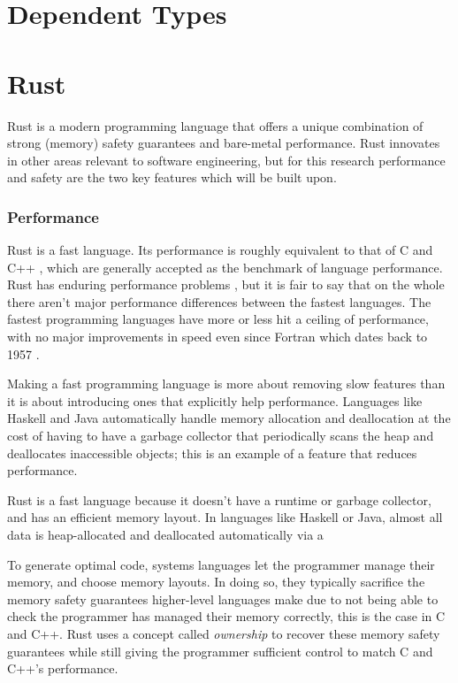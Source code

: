 \documentclass[12pt,twoside]{report}
\begin{document}
\section{Dependent Types}

\section{Rust}
Rust is a modern programming language that offers a unique combination of strong (memory) safety guarantees and bare-metal performance. Rust innovates in other areas relevant to software engineering, but for this research performance and safety are the two key features which will be built upon.

\subsubsection{Performance}
Rust is a fast language. Its performance is roughly equivalent to that of C and C++ \cite{RustVsWhich}, which are generally accepted as the benchmark of language performance. Rust has enduring performance problems \cite{AreWeStackefficient2022}, but it is fair to say that on the whole there aren't major performance differences between the fastest languages. The fastest programming languages have more or less hit a ceiling of performance, with no major improvements in speed even since Fortran \cite{GccVsClassic} which dates back to 1957 \cite[p. 16]{wilsonComparativeProgrammingLanguages2001}.

Making a fast programming language is more about removing slow features than it is about introducing ones that explicitly help performance. Languages like Haskell and Java automatically handle memory allocation and deallocation at the cost of having to have a garbage collector that periodically scans the heap and deallocates inaccessible objects; this is an example of a feature that reduces performance.

Rust is a fast language because it doesn't have a runtime or garbage collector, and has an efficient memory layout. In languages like Haskell or Java, almost all data is heap-allocated and deallocated automatically via a 

To generate optimal code, systems languages let the programmer manage their memory, and choose memory layouts. In doing so, they typically sacrifice the memory safety guarantees higher-level languages make due to not being able to check the programmer has managed their memory correctly, this is the case in C and C++. Rust uses a concept called \textit{ownership} to recover these memory safety guarantees while still giving the programmer sufficient control to match C and C++'s performance.
\end{document}
